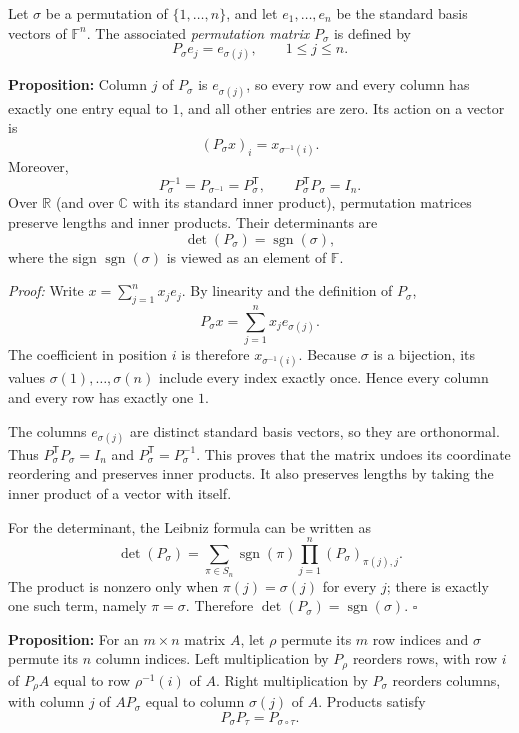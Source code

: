 \documentclass[a4paper,11pt,abstract=true]{scrartcl}
\theoremstyle{dotlessP}
\theoremstyle{dotlessS}
\theoremstyle{remark}
\theoremstyle{definition}
\begin{document}
Let $\sigma$ be a permutation of $\{1,\ldots,n\}$, and let
$e_1,\ldots,e_n$ be the standard basis vectors of $\mathbb{F}^n$.
The associated \emph{permutation matrix} $P_{\sigma}$ is defined by
\[
P_{\sigma}e_j=e_{\sigma(j)},\qquad 1\leq j\leq n.
\]
\begin{problem_box}
\textbf{Proposition:}
Column $j$ of $P_{\sigma}$ is $e_{\sigma(j)}$, so every row and every
column has exactly one entry equal to $1$, and all other entries are
zero. Its action on a vector is
\[
(P_{\sigma}x)_i=x_{\sigma^{-1}(i)}.
\]
Moreover,
\[
P_{\sigma}^{-1}=P_{\sigma^{-1}}=P_{\sigma}^{\mathsf{T}},
\qquad P_{\sigma}^{\mathsf{T}}P_{\sigma}=I_n.
\]
Over $\mathbb{R}$ (and over $\mathbb{C}$ with its standard inner
product), permutation matrices preserve lengths and inner products.
Their determinants are
\[
\det(P_{\sigma})=\operatorname{sgn}(\sigma),
\]
where the sign $\operatorname{sgn}(\sigma)$ is viewed as an element
of $\mathbb{F}$.
\end{problem_box}

\begin{claim_box}
\textit{Proof:} Write $x=\sum_{j=1}^n x_j e_j$. By linearity and the
definition of $P_{\sigma}$,
\[
P_{\sigma}x=\sum_{j=1}^n x_j e_{\sigma(j)}.
\]
The coefficient in position $i$ is therefore $x_{\sigma^{-1}(i)}$.
Because $\sigma$ is a bijection, its values $\sigma(1),\ldots,\sigma(n)$
include every index exactly once. Hence every column and every row has
exactly one $1$.

The columns $e_{\sigma(j)}$ are distinct standard basis vectors, so they
are orthonormal. Thus $P_{\sigma}^{\mathsf{T}}P_{\sigma}=I_n$ and
$P_{\sigma}^{\mathsf{T}}=P_{\sigma}^{-1}$. This proves that the matrix
undoes its coordinate reordering and preserves inner products. It also
preserves lengths by taking the inner product of a vector with itself.

For the determinant, the Leibniz formula can be written as
\[
\det(P_{\sigma})=
\sum_{\pi\in S_n}\operatorname{sgn}(\pi)
\prod_{j=1}^n(P_{\sigma})_{\pi(j),j}.
\]
The product is nonzero only when $\pi(j)=\sigma(j)$ for every $j$;
there is exactly one such term, namely $\pi=\sigma$. Therefore
$\det(P_{\sigma})=\operatorname{sgn}(\sigma)$. \hfill$\square$
\end{claim_box}

\begin{problem_box}
\textbf{Proposition:}
For an $m\times n$ matrix $A$, let $\rho$ permute its $m$ row indices
and $\sigma$ permute its $n$ column indices. Left multiplication by
$P_{\rho}$ reorders rows, with row $i$ of $P_{\rho}A$ equal to row
$\rho^{-1}(i)$ of $A$. Right multiplication by $P_{\sigma}$ reorders
columns, with column $j$ of $AP_{\sigma}$ equal to column $\sigma(j)$
of $A$. Products satisfy
\[
P_{\sigma}P_{\tau}=P_{\sigma\circ\tau}.
\]
\end{problem_box}
\end{document}
